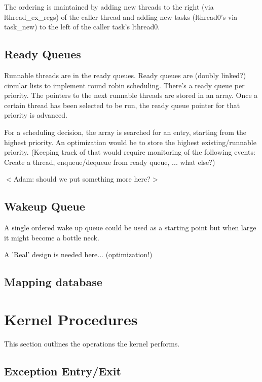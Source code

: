 \documentclass[a4paper,10pt,twoside]{article}
\begin{document}
The ordering is maintained by adding new threads to the right (via lthread\_ex\_regs) of the caller thread and adding new tasks (lthread0's via task\_new) to the left of the caller task's lthread0.
 
\subsection{Ready Queues}

Runnable threads are in the ready queues. Ready queues are (doubly linked?) circular lists to implement round robin scheduling. There's a ready queue per priority. The pointers to the next runnable threads are stored in an array. Once a certain thread has been selected to be run, the ready queue pointer for that priority is advanced. 

For a scheduling decision, the array is searched for an entry, starting from the highest priority. An optimization would be to store the highest existing/runnable priority. (Keeping track of that would require monitoring of the following events: Create a thread, enqueue/dequeue from ready queue, ... what else?)

$<$Adam: should we put something more here?$>$

\subsection{Wakeup Queue}

A single ordered wake up queue could be used as a starting point but when large it might become a bottle neck.

A 'Real' design is needed here... (optimization!)

\subsection{Mapping database}



\newpage
\section{Kernel Procedures}

This section outlines the operations the kernel performs.

\subsection{Exception Entry/Exit}
\end{document}
